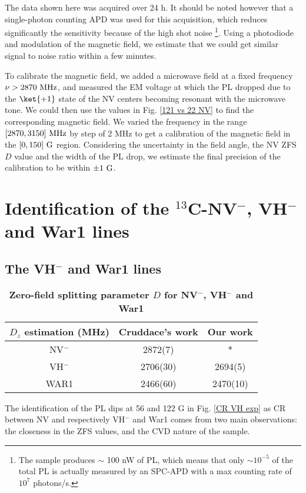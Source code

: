 \documentclass[a4paper,11pt]{report}
\begin{document}
The data shown here was acquired over 24 h. It should be noted however that a single-photon counting APD was used for this acquisition, which reduces significantly the sensitivity because of the high shot noise \footnote{The sample produces $\sim$ 100 nW of PL, which means that only $\sim 10^{-5}$ of the total PL is actually measured by an SPC-APD with a max counting rate of $10^7$ photons/s.}. Using a photodiode and modulation of the magnetic field, we estimate that we could get similar signal to noise ratio within a few minutes.

To calibrate the magnetic field, we added a microwave field at a  fixed frequency $\nu > 2870\ \rm MHz$, and measured the EM voltage at which the PL dropped due to the $\ket{+1}$ state of the NV centers becoming resonant with the microwave tone. We could then use the values in Fig. \ref{121 vs 22 NV} to find the corresponding magnetic field. We varied the frequency in the range  $[2870,3150]\ \rm MHz$ by step of 2 MHz to get a calibration of the magnetic field in the $[0,150]\ \rm G$ region. Considering the uncertainty in the field angle, the NV ZFS $D$ value and the width of the PL drop, we estimate the final precision of the calibration to be within $\pm 1\ \rm G$.

\section{Identification of the $^{13}$C-NV$^-$, VH$^-$ and War1 lines}

\subsection{The VH$^-$ and War1 lines}
\begin{table}[htbp]
\centering
\caption{\bf Zero-field splitting parameter $D$ for NV$^-$, VH$^-$ and War1}
\begin{tabular}{ccc}
\hline
$D_z$ estimation (MHz) & Cruddace's work\citep{cruddace2007magnetic} & Our work \\
\hline
NV$^-$ & 2872(7) & * \\
VH$^-$ & 2706(30) & 2694(5)  \\
WAR1 & 2466(60) & 2470(10) \\
\hline
\end{tabular}
  \label{table VH et War1}
\end{table}

The identification of the PL dips at 56 and 122 G in Fig. \ref{CR VH exp} as CR between NV and respectively VH$^-$ and War1 comes from two main observations: the closeness in the ZFS values, and the CVD nature of the sample.
\end{document}
